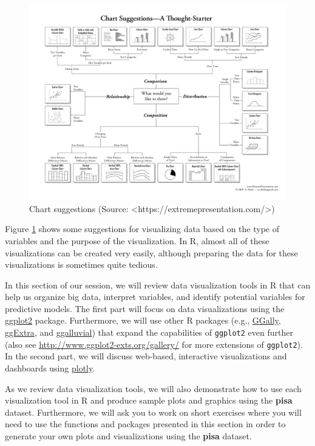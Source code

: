 \documentclass[]{book}
\begin{document}
\begin{figure}
\includegraphics[width=1\linewidth]{images/chart} \caption{Chart suggestions (Source: <https://extremepresentation.com/>)}\label{fig:fig1}
\end{figure}

Figure \ref{fig:fig1} shows some suggestions for visualizing data based on the type of variables and the purpose of the visualization. In R, almost all of these visualizations can be created very easily, although preparing the data for these visualizations is sometimes quite tedious.

In this section of our session, we will review data visualization tools in R that can help us organize big data, interpret variables, and identify potential variables for predictive models. The first part will focus on data visualizations using the \href{https://ggplot2.tidyverse.org/}{ggplot2} package. Furthermore, we will use other R packages (e.g., \href{http://ggobi.github.io/ggally/\#ggally}{GGally}, \href{https://www.ggplot2-exts.org/ggExtra.html}{ggExtra}, and \href{http://corybrunson.github.io/ggalluvial/}{ggalluvial}) that expand the capabilities of \texttt{ggplot2} even further (also see \url{http://www.ggplot2-exts.org/gallery/} for more extensions of \texttt{ggplot2}). In the second part, we will discuss web-based, interactive visualizations and dashboards using \href{https://plot.ly/r/}{plotly}.

As we review data visualization tools, we will also demonstrate how to use each visualization tool in R and produce sample plots and graphics using the \textbf{pisa} dataset. Furthermore, we will ask you to work on short exercises where you will need to use the functions and packages presented in this section in order to generate your own plots and visualizations using the \textbf{pisa} dataset.
\end{document}
